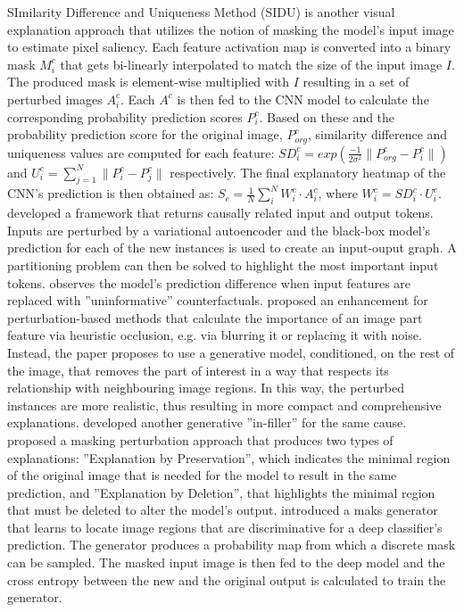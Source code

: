 \documentclass[journal]{IEEEtran}
\begin{document}
SImilarity Difference and Uniqueness Method (SIDU) \cite{Muddamsetty2020} is another visual explanation approach that utilizes the notion of masking the model's input image to estimate pixel saliency. Each feature activation map is converted into a binary mask $M_i^c$ that gets bi-linearly interpolated to match the size of the input image $I$. The produced mask is element-wise multiplied with $I$ resulting in a set of perturbed images $A_i^c$. Each $A^c$ is then fed to the CNN model to calculate the corresponding probability prediction scores $P_i^c$. Based on these and the probability prediction score for the original image, $P_{org}^c$, similarity difference and uniqueness values are computed for each feature: $SD_i^c=exp(\frac{-1}{2\sigma^2}\lVert P_{org}^c-P_i^c \rVert)$ and $U_i^c=\sum_{j=1}^N \lVert P_i^c-P_j^c \rVert$ respectively. The final explanatory heatmap of the CNN's prediction is then obtained as: $S_c=\frac{1}{N}\sum_i^NW_i^c \cdot A_i^c$, where $W_i^c=SD_i^c \cdot U_i^c$.
\cite{Alvarez-Melis2017} developed a framework that returns causally related input and output tokens. Inputs are perturbed by a variational autoencoder and the black-box model's prediction for each of the new instances is used to create an input-ouput graph. A partitioning problem can then be solved to highlight the most important input tokens.
\cite{Burns2020} observes the model's prediction difference when input features are replaced with ''uninformative'' counterfactuals.
\cite{Chang2019} proposed an enhancement for perturbation-based methods that calculate the importance of an image part feature via heuristic occlusion, e.g. via blurring it or replacing it with noise. Instead, the paper proposes to use a generative model, conditioned, on the rest of the image, that removes the part of interest in a way that respects its relationship with neighbouring image regions. In this way, the perturbed instances are more realistic, thus resulting in more compact and comprehensive explanations.
\cite{Agarwal2021} developed another generative ''in-filler'' for the same cause.
\cite{Wagner2019} proposed a masking perturbation approach that produces two types of explanations: ''Explanation by Preservation'', which indicates the minimal region of the original image that is needed for the model to result in the same prediction, and ''Explanation by Deletion'', that highlights the minimal region that must be deleted to alter the model's output.
\cite{Yuan2020b} introduced a maks generator that learns to locate image regions that are discriminative for a deep classifier's prediction. The generator produces a probability map from which a discrete mask can be sampled. The masked input image is then fed to the deep model and the cross entropy between the new and the original output is calculated to train the generator.
\end{document}
